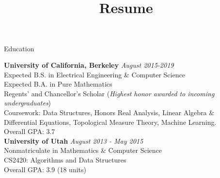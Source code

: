 \documentclass{resume} %
\title{Resume}
\begin{document}

\begin{rSection}{Education}

{\bf University of California, Berkeley} \hfill {\em August 2015-2019} \\ 
Expected B.S. in  Electrical Engineering \& Computer Science\\
Expected B.A. in Pure Mathematics \\
Regents' and Chancellor's Scholar (\textit{Highest honor awarded to incoming undergraduates}) \\
Coursework: Data Structures, {Honors} Real Analysis, Linear Algebra \& Differential Equations, Topological Measure Theory,
Machine Learning. \\
Overall GPA: 3.7 \\


{\bf University of Utah} \hfill {\em August 2013 - May 2015} \\ 
Nonmatriculate in Mathematics \& Computer Science \\
CS2420: Algorithms and Data Structures \\
Overall GPA: 3.9 (18 units) \\

\end{rSection}

\end{document}
